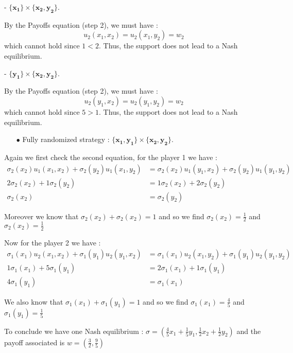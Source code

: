 - $\mathbf{\{x_1\}}\times\mathbf{\{x_2,y_2\}}$.

By the Payoffs equation (step 2), we must have :
 \begin{equation*}
    u_2(x_1,x_2)=u_2(x_1,y_2)=w_2
\end{equation*}
which cannot hold since $1<2$. Thus, the support does not lead to a Nash equilibrium.

- $\mathbf{\{y_1\}}\times\mathbf{\{x_2,y_2\}}$.

By the Payoffs equation (step 2), we must have :
 \begin{equation*}
    u_2(y_1,x_2)=u_2(y_1,y_2)=w_2
\end{equation*}
which cannot hold since $5>1$. Thus, the support does not lead to a Nash equilibrium.


\begin{itemize}
  \item[$\bullet$] Fully randomized strategy : $\mathbf{\{x_1,y_1\}}\times\mathbf{\{x_2,y_2\}}$.
\end{itemize}
Again we first check the second equation, for the player 1 we have : 
\begin{align*}
 \sigma_2(x_2)u_1(x_1,x_2) + \sigma_2(y_2)u_1(x_1,y_2) &= \sigma_2(x_2)u_1(y_1,x_2) + \sigma_2(y_2)u_1(y_1,y_2) \\
 2\sigma_2(x_2)+1\sigma_2(y_2)&= 1\sigma_2(x_2) + 2\sigma_2(y_2) \\
 \sigma_2(x_2)&=\sigma_2(y_2)
\end{align*}

Moreover we know that $\sigma_2(x_2) + \sigma_2(x_2) = 1$ and so we find $\sigma_2(x_2)=\frac{1}{2}$ and $\sigma_2(x_2)=\frac{1}{2}$

Now for the player 2 we have : 
\begin{align*}
 \sigma_1(x_1)u_2(x_1,x_2) + \sigma_1(y_1)u_2(y_1,x_2) &= \sigma_1(x_1)u_2(x_1,y_2) + \sigma_1(y_1)u_2(y_1,y_2) \\
 1\sigma_1(x_1)+5\sigma_1(y_1)&= 2\sigma_1(x_1) + 1\sigma_1(y_1) \\
 4\sigma_1(y_1)&=\sigma_1(x_1)
\end{align*}

We also know that $\sigma_1(x_1) + \sigma_1(y_1) = 1$ and so we find $\sigma_1(x_1)=\frac{4}{5}$ and $\sigma_1(y_1)=\frac{1}{5}$

To conclude we have one Nash equilibrium :
$\sigma = \left( \frac{4}{5}x_1 + \frac{1}{5}y_1, \frac{1}{2}x_2 + \frac{1}{2}y_2\right)$ and the payoff associated is $w= \left(\frac{3}{2},\frac{9}{5}\right)$
        
